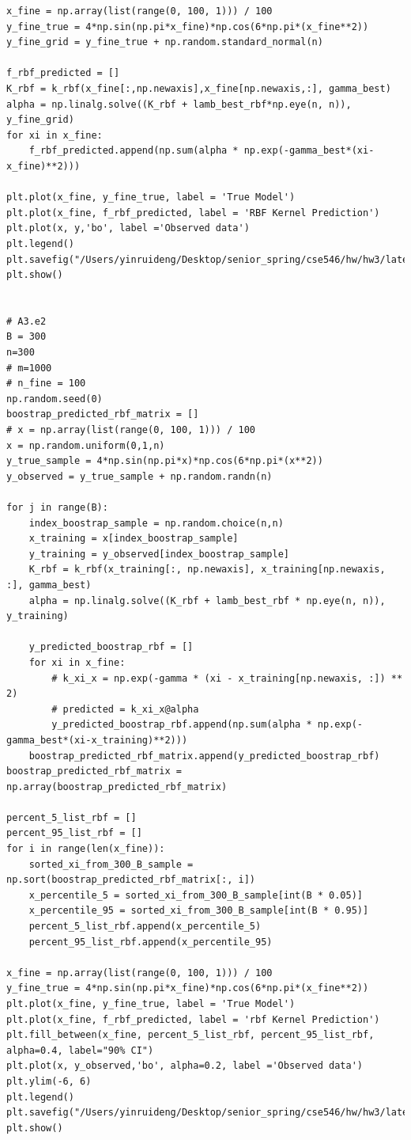 \documentclass{article}
\begin{document}
\begin{verbatim}
x_fine = np.array(list(range(0, 100, 1))) / 100
y_fine_true = 4*np.sin(np.pi*x_fine)*np.cos(6*np.pi*(x_fine**2))
y_fine_grid = y_fine_true + np.random.standard_normal(n)

f_rbf_predicted = []
K_rbf = k_rbf(x_fine[:,np.newaxis],x_fine[np.newaxis,:], gamma_best)
alpha = np.linalg.solve((K_rbf + lamb_best_rbf*np.eye(n, n)), y_fine_grid)
for xi in x_fine:
	f_rbf_predicted.append(np.sum(alpha * np.exp(-gamma_best*(xi-x_fine)**2)))

plt.plot(x_fine, y_fine_true, label = 'True Model')
plt.plot(x_fine, f_rbf_predicted, label = 'RBF Kernel Prediction')
plt.plot(x, y,'bo', label ='Observed data')
plt.legend()
plt.savefig("/Users/yinruideng/Desktop/senior_spring/cse546/hw/hw3/latex/plots/A3d_2_test.png")
plt.show()


# A3.e2
B = 300
n=300
# m=1000
# n_fine = 100
np.random.seed(0)
boostrap_predicted_rbf_matrix = []
# x = np.array(list(range(0, 100, 1))) / 100
x = np.random.uniform(0,1,n)
y_true_sample = 4*np.sin(np.pi*x)*np.cos(6*np.pi*(x**2))
y_observed = y_true_sample + np.random.randn(n)

for j in range(B):
	index_boostrap_sample = np.random.choice(n,n)
	x_training = x[index_boostrap_sample]
	y_training = y_observed[index_boostrap_sample]
	K_rbf = k_rbf(x_training[:, np.newaxis], x_training[np.newaxis, :], gamma_best)
	alpha = np.linalg.solve((K_rbf + lamb_best_rbf * np.eye(n, n)), y_training)
	
	y_predicted_boostrap_rbf = []
	for xi in x_fine:
		# k_xi_x = np.exp(-gamma * (xi - x_training[np.newaxis, :]) ** 2)
		# predicted = k_xi_x@alpha
		y_predicted_boostrap_rbf.append(np.sum(alpha * np.exp(-gamma_best*(xi-x_training)**2)))
	boostrap_predicted_rbf_matrix.append(y_predicted_boostrap_rbf)
boostrap_predicted_rbf_matrix = np.array(boostrap_predicted_rbf_matrix)

percent_5_list_rbf = []
percent_95_list_rbf = []
for i in range(len(x_fine)):
	sorted_xi_from_300_B_sample = np.sort(boostrap_predicted_rbf_matrix[:, i])
	x_percentile_5 = sorted_xi_from_300_B_sample[int(B * 0.05)]
	x_percentile_95 = sorted_xi_from_300_B_sample[int(B * 0.95)]
	percent_5_list_rbf.append(x_percentile_5)
	percent_95_list_rbf.append(x_percentile_95)

x_fine = np.array(list(range(0, 100, 1))) / 100
y_fine_true = 4*np.sin(np.pi*x_fine)*np.cos(6*np.pi*(x_fine**2))
plt.plot(x_fine, y_fine_true, label = 'True Model')
plt.plot(x_fine, f_rbf_predicted, label = 'rbf Kernel Prediction')
plt.fill_between(x_fine, percent_5_list_rbf, percent_95_list_rbf, alpha=0.4, label="90% CI")
plt.plot(x, y_observed,'bo', alpha=0.2, label ='Observed data')
plt.ylim(-6, 6)
plt.legend()
plt.savefig("/Users/yinruideng/Desktop/senior_spring/cse546/hw/hw3/latex/plots/A3e_2_test.png")
plt.show()








\end{verbatim}
\end{document}
